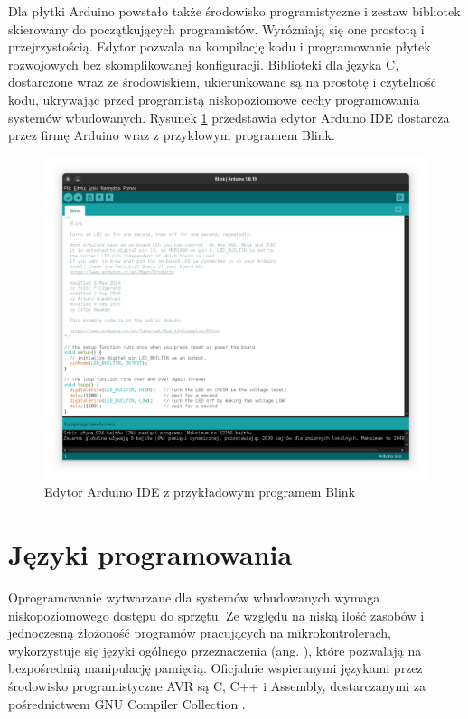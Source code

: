 Dla płytki Arduino powstało także środowisko programistyczne i zestaw bibliotek skierowany do początkujących programistów. Wyróżniają się one prostotą i przejrzystością. Edytor pozwala na kompilację kodu i programowanie płytek rozwojowych bez skomplikowanej konfiguracji. Biblioteki dla języka C, dostarczone wraz ze środowiskiem, ukierunkowane są na prostotę i czytelność kodu, ukrywając przed programistą niskopoziomowe cechy programowania systemów wbudowanych. Rysunek \ref{fig:edytor} przedstawia edytor Arduino IDE dostarcza przez firmę Arduino wraz z przykłowym programem Blink.
\begin{figure}
\centering
	\includegraphics[width=1\textwidth]{graf/arduino-ide-blink.png}
	\caption{Edytor Arduino IDE z przykładowym programem Blink}
\label{fig:edytor}
\end{figure}

\section{Języki programowania}
Oprogramowanie wytwarzane dla systemów wbudowanych wymaga niskopoziomowego dostępu do sprzętu. Ze względu na niską ilość zasobów i jednoczesną złożoność programów pracujących na mikrokontrolerach, wykorzystuje się języki ogólnego przeznaczenia (ang. ), które pozwalają na bezpośrednią manipulację pamięcią. Oficjalnie wspieranymi językami przez środowisko programistyczne AVR są C, C++ i Assembly, dostarczanymi za pośrednictwem GNU Compiler Collection .

